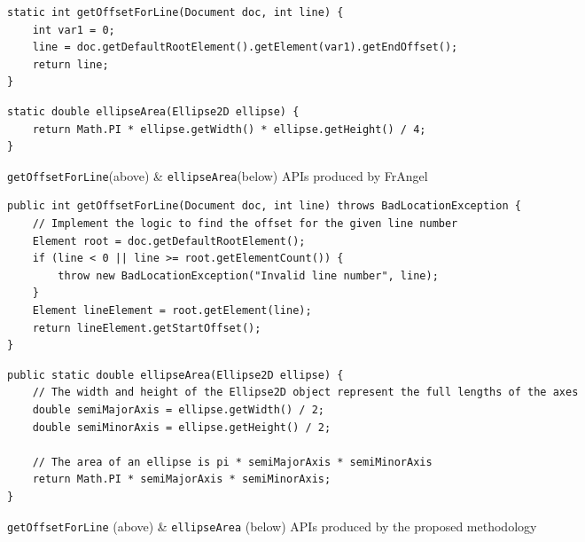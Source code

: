 \begin{figure}
    \centering
    \begin{minipage}[t]{0.47\linewidth}
	\begin{lstlisting}[style = Java-github]
static int getOffsetForLine(Document doc, int line) {
    int var1 = 0;
    line = doc.getDefaultRootElement().getElement(var1).getEndOffset();
    return line;
}
        \end{lstlisting}
        \vspace{.5in}
        \begin{lstlisting}[style = Java-github]
static double ellipseArea(Ellipse2D ellipse) {
    return Math.PI * ellipse.getWidth() * ellipse.getHeight() / 4;
}
        \end{lstlisting}
    \vspace{.75in}
    \caption{\texttt{getOffsetForLine}(above) \& \texttt{ellipseArea}(below) APIs produced by FrAngel}
    \label{fig:figure1}
    \end{minipage}
\hspace{.2in}
    \begin{minipage}[t]{0.47\linewidth}
        \begin{lstlisting}[style = Java-github]
public int getOffsetForLine(Document doc, int line) throws BadLocationException {
    // Implement the logic to find the offset for the given line number
    Element root = doc.getDefaultRootElement();
    if (line < 0 || line >= root.getElementCount()) {
        throw new BadLocationException("Invalid line number", line);
    }
    Element lineElement = root.getElement(line);
    return lineElement.getStartOffset();
}
        \end{lstlisting}
	\begin{lstlisting}[style = Java-github]
public static double ellipseArea(Ellipse2D ellipse) {
    // The width and height of the Ellipse2D object represent the full lengths of the axes
    double semiMajorAxis = ellipse.getWidth() / 2;
    double semiMinorAxis = ellipse.getHeight() / 2;
        
    // The area of an ellipse is pi * semiMajorAxis * semiMinorAxis
    return Math.PI * semiMajorAxis * semiMinorAxis;
}
        \end{lstlisting}
        \vspace{.16in}
    \caption{\texttt{getOffsetForLine} (above) \& \texttt{ellipseArea} (below) APIs produced by the proposed methodology}
    \label{fig:figure2}
    \end{minipage}
\end{figure}

